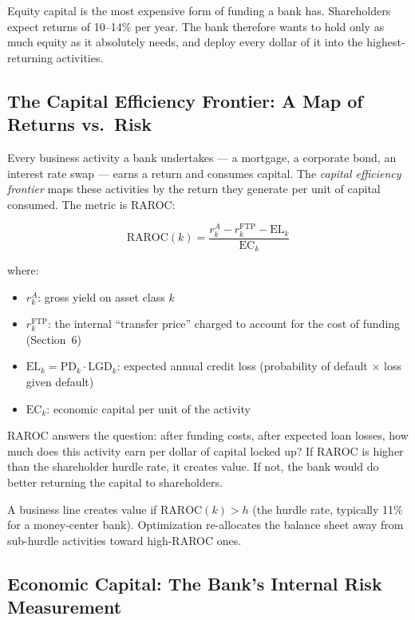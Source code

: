 \documentclass[12pt,a4paper]{article}
\begin{document}
Equity capital is the most expensive form of funding a bank has.  Shareholders
expect returns of 10--14\% per year.  The bank therefore wants to hold only
as much equity as it absolutely needs, and deploy every dollar of it into
the highest-returning activities.

\subsection{The Capital Efficiency Frontier: A Map of Returns vs.\ Risk}

Every business activity a bank undertakes --- a mortgage, a corporate bond,
an interest rate swap --- earns a return and consumes capital.  The
\emph{capital efficiency frontier} maps these activities by the return they
generate per unit of capital consumed.  The metric is RAROC:

\begin{equation}
  \text{RAROC}(k) = \frac{r_k^A - r_k^{\text{FTP}} - \text{EL}_k}
                         {\text{EC}_k}
\end{equation}

where:
\begin{itemize}[noitemsep]
  \item $r_k^A$: gross yield on asset class $k$
  \item $r_k^{\text{FTP}}$: the internal ``transfer price'' charged to
        account for the cost of funding (Section~6)
  \item $\text{EL}_k = \text{PD}_k \cdot \text{LGD}_k$: expected annual
        credit loss (probability of default $\times$ loss given default)
  \item $\text{EC}_k$: economic capital per unit of the activity
\end{itemize}

\begin{mdframed}[style=plainenglish]
RAROC answers the question: after funding costs, after expected loan losses,
how much does this activity earn per dollar of capital locked up?  If RAROC
is higher than the shareholder hurdle rate, it creates value.  If not, the
bank would do better returning the capital to shareholders.
\end{mdframed}

A business line creates value if $\text{RAROC}(k) > h$ (the hurdle rate,
typically 11\% for a money-center bank).  Optimization re-allocates the
balance sheet away from sub-hurdle activities toward high-RAROC ones.

\subsection{Economic Capital: The Bank's Internal Risk Measurement}
\end{document}
